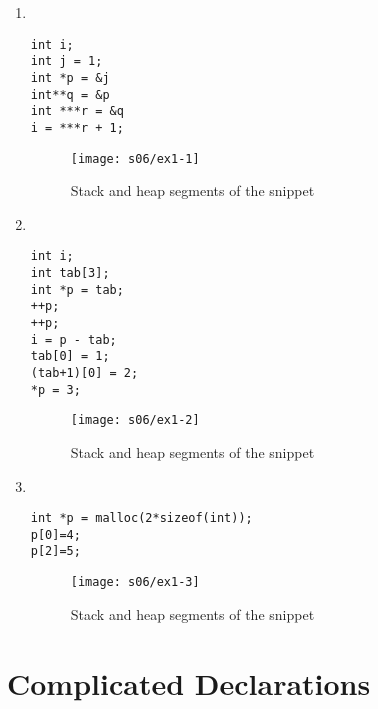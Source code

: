 \pagebreak
\begin{enumerate}
    \item \
    \begin{lstlisting}
int i;
int j = 1;
int *p = &j
int**q = &p
int ***r = &q
i = ***r + 1;
    \end{lstlisting}

    \begin{figure}[H]
        \center
        \texttt{[image: s06/ex1-1]}
        \caption{Stack and heap segments of the snippet \theenumi\label{fig:ex1-1}}
    \end{figure}

    \item \
    \begin{lstlisting}
int i;
int tab[3];
int *p = tab;
++p;
++p;
i = p - tab;
tab[0] = 1;
(tab+1)[0] = 2;
*p = 3;
    \end{lstlisting}

    \begin{figure}[H]
        \center
        \texttt{[image: s06/ex1-2]}
        \caption{Stack and heap segments of the snippet \theenumi\label{fig:ex1-2}}
    \end{figure}

    \pagebreak
    \item \
    \begin{lstlisting}
int *p = malloc(2*sizeof(int));
p[0]=4;
p[2]=5;
    \end{lstlisting}

    \begin{figure}[H]
        \center
        \texttt{[image: s06/ex1-3]}
        \caption{Stack and heap segments of the snippet \theenumi\label{fig:ex1-3}}
    \end{figure}
\end{enumerate}



%
%
\bigskip
\bigskip
\section{Complicated Declarations}


